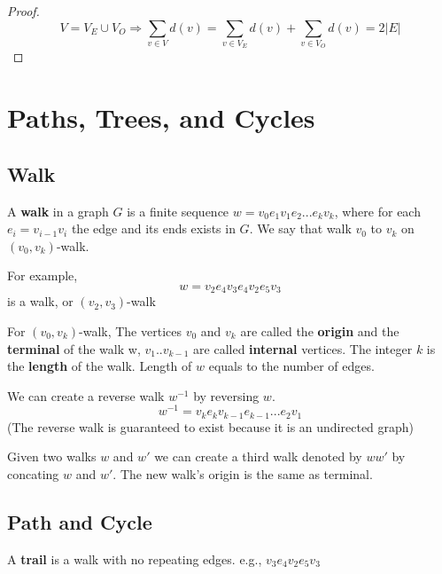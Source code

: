 			\begin{proof}
				\begin{equation}
					V = V_E\cup V_O \Rightarrow 
					\sum_{v\in V}d(v) = \sum_{v\in V_E} d(v) + \sum_{v\in V_O}d(v) = 2|E|
				\end {equation}			
			\end{proof}

	\chapter{Paths, Trees, and Cycles}
		\section{Walk}
			\begin{definition}[walk]
				A \textbf{walk} in a graph $G$ is a finite sequence $w=v_0e_1v_1e_2...e_kv_k$, where for each $e_i=v_{i-1}v_i$ the edge and its ends exists in $G$. We say that walk $v_0$ to $v_k$ on $(v_0, v_k)$-walk.
			\end{definition}
			For example,
			\begin{equation}
				w = v_2e_4v_3e_4v_2e_5v_3
			\end{equation}
			is a walk, or $(v_2, v_3)$-walk\\

			\begin{definition}
				For $(v_0, v_k)$-walk, The vertices $v_0$ and $v_k$ are called the \textbf{origin} and the \textbf{terminal} of the walk w, $v_1..v_{k-1}$ are called \textbf{internal} vertices. The integer $k$ is the \textbf{length} of the walk. Length of $w$ equals to the number of edges.
			\end{definition}
			
			We can create a reverse walk $w^{-1}$ by reversing $w$.
	 		\begin{equation}
	 			w^{-1} = v_ke_kv_{k-1}e_{k-1}...e_2v_1
	 		\end{equation}
	 		(The reverse walk is guaranteed to exist because it is an undirected graph)

	 		Given two walks $w$ and $w'$ we can create a third walk denoted by $ww'$ by concating $w$ and $w'$. The new walk's origin is the same as terminal.

	 	\section{Path and Cycle}
	 		\begin{definition}[trail]
	 			A \textbf{trail} is a walk with no repeating edges. e.g., $v_3e_4v_2e_5v_3$
	 		\end{definition}
	 		
